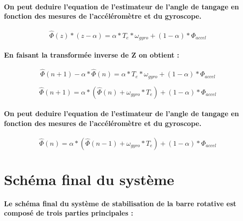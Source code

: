 \paragraph{On peut deduire l'equation de l'estimateur de l'angle de tangage en fonction des mesures de l'accéléromètre et du gyroscope.}

\begin{equation}
	\hat{\Phi}(z) * (z - \alpha) = \alpha * T_e * \omega_{gyro} + (1 - \alpha) * \Phi_{accel}
\end{equation}

\paragraph{En faisant la transformée inverse de Z on obtient :}

\begin{equation}
	\hat{\Phi}(n + 1) - \alpha * \hat{\Phi}(n) = \alpha * T_e * \omega_{gyro} + (1 - \alpha) * \Phi_{accel}
\end{equation}

\begin{equation}
	\hat{\Phi}(n + 1) = \alpha * (\hat{\Phi}(n) + \omega_{gyro} * T_e) + (1 - \alpha) * \Phi_{accel}
\end{equation}

\paragraph{On peut deduire l'equation de l'estimateur de l'angle de tangage en fonction des mesures de l'accéléromètre et du gyroscope.}

\begin{equation}
	\hat{\Phi}(n) = \alpha * (\hat{\Phi}(n - 1) + \omega_{gyro} * T_e) + (1 - \alpha) * \Phi_{accel}
\end{equation}

\section{Schéma final du système}

\paragraph{Le schéma final du système de stabilisation de la barre rotative est composé de trois parties principales :}

